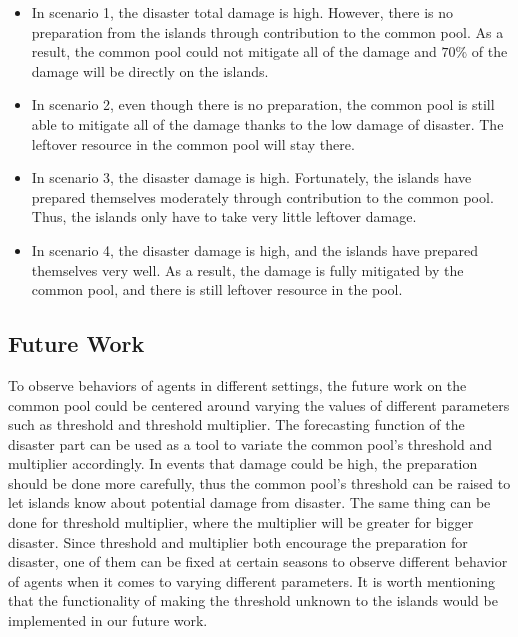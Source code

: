 \begin{itemize}
    \item In scenario 1, the disaster total damage is high. However, there is no preparation from the islands through contribution to the common pool. As a result, the common pool could not mitigate all of the damage and $70\%$ of the damage will be directly on the islands.
    \item In scenario 2, even though there is no preparation, the common pool is still able to mitigate all of the damage thanks to the low damage of disaster. The leftover resource in the common pool will stay there.
    \item In scenario 3, the disaster damage is high. Fortunately, the islands have prepared themselves moderately through contribution to the common pool. Thus, the islands only have to take very little leftover damage.
    \item In scenario 4, the disaster damage is high, and the islands have prepared themselves very well. As a result, the damage is fully mitigated by the common pool, and there is still leftover resource in the pool. 
\end{itemize}


\subsection{Future Work}

To observe behaviors of agents in different settings, the future work on the common pool could be centered around varying the values of different parameters such as threshold and threshold multiplier. The forecasting function of the disaster part can be used as a tool to variate the common pool’s threshold and multiplier accordingly. In events that damage could be high, the preparation should be done more carefully, thus the common pool’s threshold can be raised to let islands know about potential damage from disaster. The same thing can be done for threshold multiplier, where the multiplier will be greater for bigger disaster. Since threshold and multiplier both encourage the preparation for disaster, one of them can be fixed at certain seasons to observe different behavior of agents when it comes to varying different parameters. It is worth mentioning that the functionality of making the threshold unknown to the islands would be implemented in our future work.